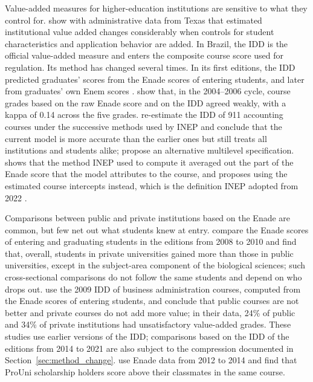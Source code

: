 \documentclass[12pt,letterpaper]{article}
\begin{document}
Value-added measures for higher-education institutions are sensitive to what they control for. \citet{cunha2014} show with administrative data from Texas that estimated institutional value added changes considerably when controls for student characteristics and application behavior are added. In Brazil, the IDD is the official value-added measure and enters the composite course score used for regulation. Its method has changed several times. In its first editions, the IDD predicted graduates' scores from the Enade scores of entering students, and later from graduates' own Enem scores \citep{bittencourt2008,garcia2014,inep2022idd}. \citet{bittencourt2008} show that, in the 2004--2006 cycle, course grades based on the raw Enade score and on the IDD agreed weakly, with a kappa of 0.14 across the five grades. \citet{fernandes2020} re-estimate the IDD of 911 accounting courses under the successive methods used by INEP and conclude that the current model is more accurate than the earlier ones but still treats all institutions and students alike; \citet{fernandes2021} propose an alternative multilevel specification. \citet{terhaar2021} shows that the method INEP used to compute it averaged out the part of the Enade score that the model attributes to the course, and proposes using the estimated course intercepts instead, which is the definition INEP adopted from 2022 \citep{inep2023idd}.

Comparisons between public and private institutions based on the Enade are common, but few net out what students knew at entry. \citet{melguizo2016} compare the Enade scores of entering and graduating students in the editions from 2008 to 2010 and find that, overall, students in private universities gained more than those in public universities, except in the subject-area component of the biological sciences; such cross-sectional comparisons do not follow the same students and depend on who drops out. \citet{garcia2014} use the 2009 IDD of business administration courses, computed from the Enade scores of entering students, and conclude that public courses are not better and private courses do not add more value; in their data, 24\% of public and 34\% of private institutions had unsatisfactory value-added grades. These studies use earlier versions of the IDD; comparisons based on the IDD of the editions from 2014 to 2021 are also subject to the compression documented in Section~\ref{sec:method_change}. \citet{wainer2018} use Enade data from 2012 to 2014 and find that ProUni scholarship holders score above their classmates in the same course.
\end{document}
